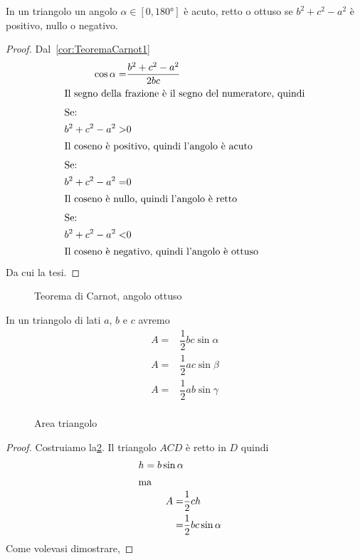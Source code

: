\begin{cor}
	In un triangolo un angolo $\alpha\in[0,\ang{180}]$ è acuto, retto o ottuso se $b^2+c^2-a^2$ è positivo, nullo o negativo.
\end{cor}
\begin{proof}
	Dal~\cref{cor:TeoremaCarnot1} \begin{align*}
	\cos\alpha=&\dfrac{b^2+c^2-a^2}{2bc}\\
	\intertext{Il segno della frazione è il segno del numeratore, quindi}
	\intertext{Se:}
	b^2+c^2-a^2>&0\\
	\intertext{Il coseno è positivo, quindi l'angolo è acuto}
	\intertext{Se:}
	b^2+c^2-a^2=&0\\
	\intertext{Il coseno è nullo, quindi l'angolo è retto}
		\intertext{Se:}
	b^2+c^2-a^2<&0\\
	\intertext{Il coseno è negativo, quindi l'angolo è ottuso}
	\end{align*}
	Da cui la tesi.
\end{proof}
\begin{figure}
	\centering
	
	\caption{Teorema di Carnot, angolo ottuso}
	\label{fig:triangolopitagorico2}
\end{figure}
\begin{thm}\label{thm:areatriangoloseno}
	In un triangolo di lati $a$, $b$ e $c$ avremo
	\begin{align*}
		A=&\dfrac{1}{2}bc\sin\alpha\\
			A=&\dfrac{1}{2}ac\sin\beta\\
			A=&\dfrac{1}{2}ab\sin\gamma\\
	\end{align*}
\end{thm}
\begin{figure}
	\centering
	
	\caption{Area triangolo}
	\label{fig:triangoloareaseno}
\end{figure}
\begin{proof}
Costruiamo la\cref{fig:triangoloareaseno}. Il triangolo $ACD$ è retto in $D$ quindi
\begin{align*}
	h=b\sin\alpha\\
	\intertext{ma}
	A=&\dfrac{1}{2}ch\\
=&\dfrac{1}{2}bc\sin\alpha\\
\end{align*}
Come volevasi dimostrare,
\end{proof}